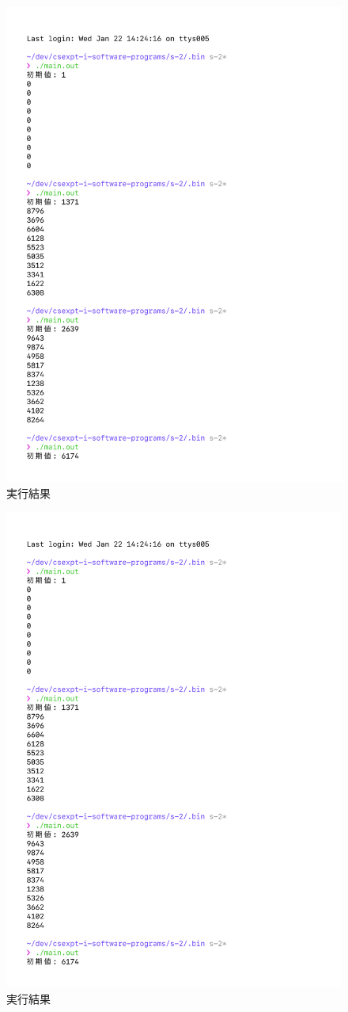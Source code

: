 % 
\begin{figure}[H]
    \centering
    \includegraphics[width=0.8\hsize, pagebox=mediabox, page=1]{main_result_img.pdf}
    \caption{実行結果}
    \label{実行結果}
\end{figure}
\begin{figure}[H]
    \ContinuedFloat
    \centering
    \includegraphics[width=0.8\hsize, pagebox=mediabox, page=2]{main_result_img.pdf}
    \caption{実行結果}
    \label{実行結果}
\end{figure}
